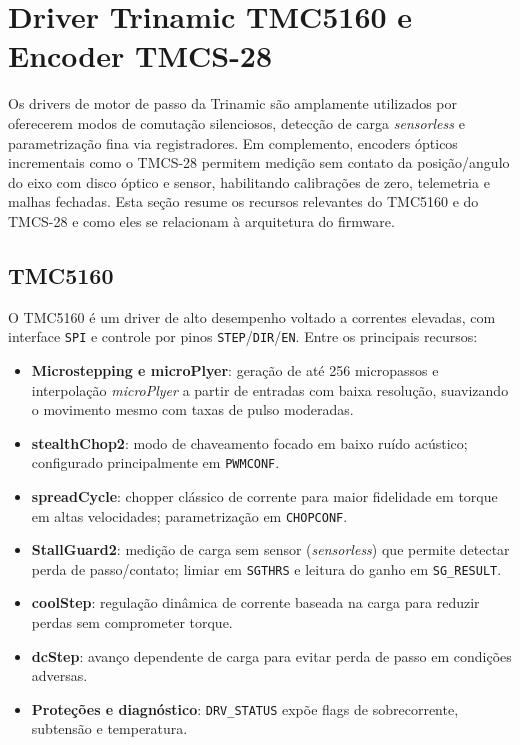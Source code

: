 \section{Driver Trinamic TMC5160 e Encoder TMCS-28}

Os drivers de motor de passo da Trinamic s\~ao amplamente utilizados por
oferecerem modos de comuta\c{c}\~ao silenciosos, detec\c{c}\~ao de carga
\emph{sensorless} e parametriza\c{c}\~ao fina via registradores. Em
complemento, encoders \'{o}pticos incrementais como o TMCS-28 permitem
medi\c{c}\~ao sem contato da posi\c{c}\~ao/angulo do eixo com disco \'{o}ptico e
sensor, habilitando calibra\c{c}\~oes de zero, telemetria e malhas fechadas.
Esta se\c{c}\~ao resume os recursos relevantes do TMC5160 e do TMCS-28 e como
eles se relacionam \`a arquitetura do firmware.

\subsection{TMC5160}

O TMC5160 \'e um driver de alto desempenho voltado a correntes elevadas,
com interface \texttt{SPI} e controle por pinos \texttt{STEP}/\texttt{DIR}/\texttt{EN}.
Entre os principais recursos:

\begin{itemize}
\item \textbf{Microstepping e microPlyer}: gera\c{c}\~ao de at\'e 256 micropassos e
  interpola\c{c}\~ao \textit{microPlyer} a partir de entradas com baixa
  resolu\c{c}\~ao, suavizando o movimento mesmo com taxas de pulso moderadas.
\item \textbf{stealthChop2}: modo de chaveamento focado em baixo ru\'ido
  ac\'ustico; configurado principalmente em \texttt{PWMCONF}.
\item \textbf{spreadCycle}: chopper cl\'assico de corrente para maior fidelidade
  em torque em altas velocidades; parametriza\c{c}\~ao em \texttt{CHOPCONF}.
\item \textbf{StallGuard2}: medi\c{c}\~ao de carga sem sensor (\emph{sensorless}) que
  permite detectar perda de passo/contato; limiar em \texttt{SGTHRS} e leitura
  do ganho em \texttt{SG\_RESULT}.
\item \textbf{coolStep}: regula\c{c}\~ao din\^amica de corrente baseada na carga para
  reduzir perdas sem comprometer torque.
\item \textbf{dcStep}: avan\c{c}o dependente de carga para evitar perda de passo
  em condi\c{c}\~oes adversas.
\item \textbf{Prote\c{c}\~oes e diagn\'ostico}: \texttt{DRV\_STATUS} exp\~oe flags de
  sobrecorrente, subtens\~ao e temperatura.
\end{itemize}

